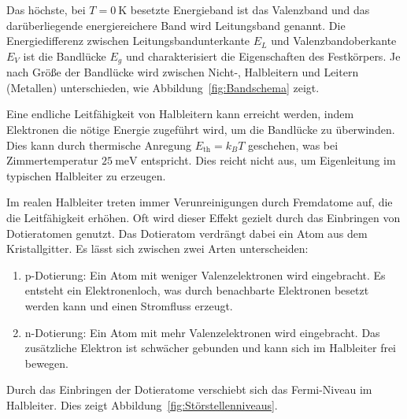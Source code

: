 \documentclass[parskip=half, a4paper,twoside,final]{article}
\begin{document}
Das höchste, bei $T=\SI{0}{\kelvin}$ besetzte Energieband ist das Valenzband und das darüberliegende energiereichere Band wird Leitungsband genannt. Die Energiedifferenz zwischen Leitungsbandunterkante $E_L$ und Valenzbandoberkante $E_V$ ist die Bandlücke $E_g$ und charakterisiert die Eigenschaften des Festkörpers. Je nach Größe der Bandlücke wird zwischen Nicht-, Halbleitern und Leitern (Metallen) unterschieden, wie Abbildung~\ref{fig:Bandschema} zeigt.



Eine endliche Leitfähigkeit von Halbleitern kann erreicht werden, indem Elektronen die nötige Energie zugeführt wird, um die Bandlücke zu überwinden. Dies kann durch thermische Anregung $E_\text{th} = k_B T$ geschehen, was bei Zimmertemperatur $\SI{25}{\milli\electronvolt}$ entspricht. Dies reicht nicht aus, um Eigenleitung im typischen Halbleiter zu erzeugen.

Im realen Halbleiter treten immer Verunreinigungen durch Fremdatome auf, die die Leitfähigkeit erhöhen. Oft wird dieser Effekt gezielt durch das Einbringen von Dotieratomen genutzt. Das Dotieratom verdrängt dabei ein Atom aus dem Kristallgitter. Es lässt sich zwischen zwei Arten unterscheiden:
\begin{enumerate}
  \item p-Dotierung: Ein Atom mit weniger Valenzelektronen wird eingebracht. Es entsteht ein Elektronenloch, was durch benachbarte Elektronen besetzt werden kann und einen Stromfluss erzeugt.
  \item n-Dotierung: Ein Atom mit mehr Valenzelektronen wird eingebracht. Das zusätzliche Elektron ist schwächer gebunden und kann sich im Halbleiter frei bewegen.
\end{enumerate}

Durch das Einbringen der Dotieratome verschiebt sich das Fermi-Niveau im Halbleiter. Dies zeigt Abbildung~\ref{fig:Störstellenniveaus}.


\end{document}
